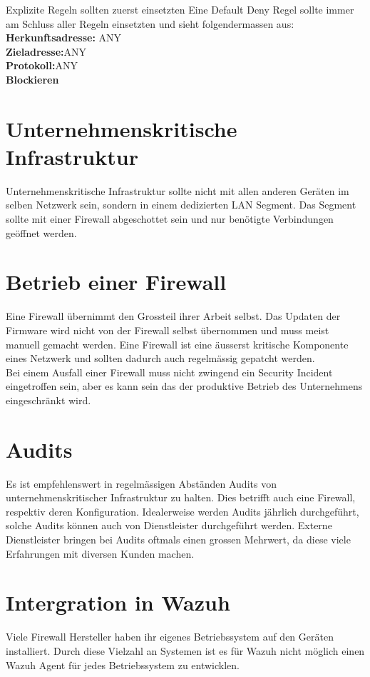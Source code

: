 Explizite Regeln sollten zuerst einsetzten 
Eine Default Deny Regel sollte immer am Schluss aller Regeln einsetzten und sieht folgendermassen aus:\\
\textbf{Herkunftsadresse:} \quad ANY\\
\textbf{Zieladresse:}\quad\quad\quad\quad ANY\\
\textbf{Protokoll:}\quad\quad\quad\quad\quad ANY\\
\textbf{Blockieren}


\section{Unternehmenskritische Infrastruktur}
Unternehmenskritische Infrastruktur sollte nicht mit allen anderen Geräten im selben Netzwerk sein, sondern in einem dedizierten LAN Segment.
Das Segment sollte mit einer Firewall abgeschottet sein und nur benötigte Verbindungen geöffnet werden.

\section{Betrieb einer Firewall}
Eine Firewall übernimmt den Grossteil ihrer Arbeit selbst.
Das Updaten der Firmware wird nicht von der Firewall selbst übernommen und muss meist manuell gemacht werden.
Eine Firewall ist eine äusserst kritische Komponente eines Netzwerk und sollten dadurch auch regelmässig gepatcht werden.\\

Bei einem Ausfall einer Firewall muss nicht zwingend ein Security Incident eingetroffen sein, aber es kann sein das der produktive Betrieb des Unternehmens eingeschränkt wird.

\section{Audits}
Es ist empfehlenswert in regelmässigen Abständen Audits von unternehmenskritischer Infrastruktur zu halten.
Dies betrifft auch eine Firewall, respektiv deren Konfiguration.
Idealerweise werden Audits jährlich durchgeführt, solche Audits können auch von Dienstleister durchgeführt werden.
Externe Dienstleister bringen bei Audits oftmals einen grossen Mehrwert, da diese viele Erfahrungen mit diversen Kunden machen.

\section{Intergration in Wazuh}
Viele Firewall Hersteller haben ihr eigenes Betriebssystem auf den Geräten installiert.
Durch diese Vielzahl an Systemen ist es für Wazuh nicht möglich einen Wazuh Agent für jedes Betriebssystem zu entwicklen.

